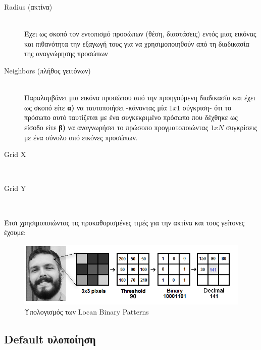\begin{description}
    \item[Radius (ακτίνα)] \hfill \\
    Έχει ως σκοπό τον εντοπισμό προσώπων (θέση, διαστάσεις) εντός μιας εικόνας
    και πιθανότητα την εξαγωγή τους για να χρησιμοποιηθούν από τη διαδικασία της
    αναγνώρησης προσώπων

    \item[Neighbors (πλήθος γειτόνων)] \hfill \\
    Παραλαμβάνει μια εικόνα προσώπου από την προηγούμενη διαδικασία και έχει ως
    σκοπό είτε \textbf{α)} να ταυτοποιήσει -κάνοντας μία $1x1$ σύγκριση- ότι το
    πρόσωπο αυτό ταυτίζεται με ένα συγκεκριμένο πρόσωπο που δέχθηκε ως είσοδο
    είτε \textbf{β)} να αναγνωρήσει το πρώσοπο προγματοποιώντας $1xN$ συγκρίσεις
    με ένα σύνολο από εικόνες προσώπων.

    \item[Grid X] \hfill \\
    \item[Grid Y] \hfill \\
\end{description}

Έτσι χρησιμοποιώντας τις προκαθορισμένες τιμές για την ακτίνα και τους γείτονες έχουμε:


\begin{figure}[htbp]
  \begin{center}
    \includegraphics[width=1.0\maxwidth]{../figures/lbph1.png}
    \caption{Υπολογισμός των Locan Binary Patterns}
    \label{fig:lbph1}
  \end{center}
\end{figure}

\subsection{Default υλοποίηση}\label{subsec:lbphdef}

